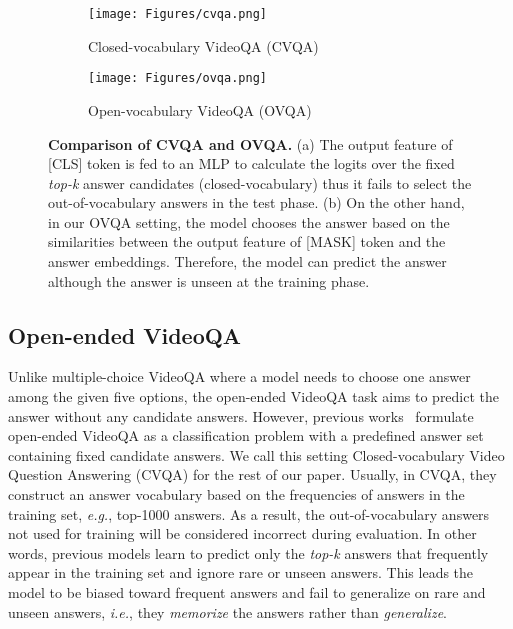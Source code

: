\documentclass[10pt,twocolumn,letterpaper]{article}
\begin{document}
\begin{figure*}[t] 
    \centering
    \begin{subfigure}[t]{0.425\linewidth}
        \texttt{[image: Figures/cvqa.png]}
        \caption{Closed-vocabulary VideoQA (CVQA)}
        \label{fig:cvqa}
    \end{subfigure}
    \begin{subfigure}[t]{0.565\linewidth}
        \texttt{[image: Figures/ovqa.png]}
        \caption{Open-vocabulary VideoQA (OVQA)}
        \label{fig:ovqa}
    \end{subfigure}
    \caption{\textbf{Comparison of CVQA and OVQA.}
    (a) The output feature of [CLS] token is fed to an MLP to calculate the logits over the fixed \textit{top-k} answer candidates (closed-vocabulary) thus it fails to select the out-of-vocabulary answers in the test phase.
    (b) On the other hand, in our OVQA setting, the model chooses the answer based on the similarities between the output feature of [MASK] token and the answer embeddings.
    Therefore, the model can predict the answer although the answer is unseen at the training phase.
    }
    \label{fig:comparison}
\end{figure*}

 \subsection{Open-ended VideoQA}
\label{subsec:oeqa}

Unlike multiple-choice VideoQA where a model needs to choose one answer among the given five options, the open-ended VideoQA task aims to predict the answer without any candidate answers.
However, previous works~\cite{lei2021less,wang2022all,li2020hero,fu2021violet,zellers2021merlot,le2020hierarchical,yang2022zero} formulate open-ended VideoQA as a classification problem with a predefined answer set containing fixed candidate answers.
We call this setting Closed-vocabulary Video Question Answering (CVQA) for the rest of our paper.
Usually, in CVQA, they construct an answer vocabulary based on the frequencies of answers in the training set, \textit{e.g.}, top-1000 answers.
As a result, the out-of-vocabulary answers not used for training will be considered incorrect during evaluation.
In other words, previous models learn to predict only the \textit{top-k} answers that frequently appear in the training set and ignore rare or unseen answers.
This leads the model to be biased toward frequent answers and fail to generalize on rare and unseen answers, \textit{i.e.}, they \textit{memorize} the answers rather than \textit{generalize}.
\end{document}
